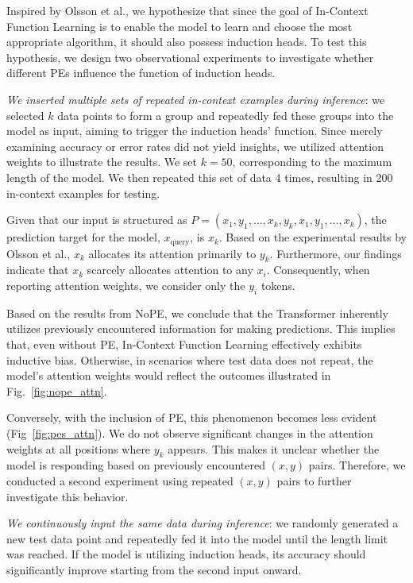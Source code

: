 \documentclass[letterpaper]{article} %
\begin{document}
Inspired by Olsson et al., we hypothesize that since the goal of In-Context Function Learning is to enable the model to learn and choose the most appropriate algorithm, it should also possess induction heads. To test this hypothesis, we design two observational experiments to investigate whether different PEs influence the function of induction heads.

\textit{We inserted multiple sets of repeated in-context examples during inference}: we selected $k$ data points to form a group and repeatedly fed these groups into the model as input, aiming to trigger the induction heads' function. Since merely examining accuracy or error rates did not yield insights, we utilized attention weights to illustrate the results. We set $k=50$, corresponding to the maximum length of the model. We then repeated this set of data 4 times, resulting in 200 in-context examples for testing.

Given that our input is structured as $P = (x_1, y_1, \ldots, x_k, y_k, x_1, y_1, \ldots, x_k)$, the prediction target for the model, $x_{\text{query}}$, is $x_k$. Based on the experimental results by Olsson et al., $x_k$ allocates its attention primarily to $y_k$. Furthermore, our findings indicate that $x_k$ scarcely allocates attention to any $x_i$. Consequently, when reporting attention weights, we consider only the $y_i$ tokens. 

Based on the results from NoPE, we conclude that the Transformer inherently utilizes previously encountered information for making predictions. This implies that, even without PE, In-Context Function Learning effectively exhibits inductive bias. Otherwise, in scenarios where test data does not repeat, the model's attention weights would reflect the outcomes illustrated in Fig.~\ref{fig:nope_attn}.

Conversely, with the inclusion of PE, this phenomenon becomes less evident (Fig~\ref{fig:pes_attn}). We do not observe significant changes in the attention weights at all positions where $y_k$ appears. This makes it unclear whether the model is responding based on previously encountered $(x, y)$ pairs. Therefore, we conducted a second experiment using repeated $(x, y)$ pairs to further investigate this behavior.

\textit{We continuously input the same data during inference}: we randomly generated a new test data point and repeatedly fed it into the model until the length limit was reached. If the model is utilizing induction heads, its accuracy should significantly improve starting from the second input onward.
\end{document}
